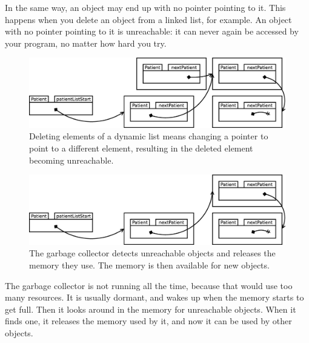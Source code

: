 In the same way, an object may end up with no pointer pointing to
it. This happens when you delete an object from a linked list, for
example. An object with no pointer pointing to it is unreachable: it
can never again be accessed by your program, no matter how hard you
try. 

\begin{figure}[hbtp]
  \centering
  \includegraphics[width=\textwidth]{gfx/lists-remove-2}
  \caption{Deleting elements of a dynamic list means changing a pointer
    to point to a different element, resulting in the deleted element
    becoming unreachable.}
  \label{fig:padfsajdg4g}
\end{figure}

\begin{figure}[hbtp]
  \centering
  \includegraphics[width=\textwidth]{gfx/lists-remove-3}
  \caption{The garbage collector detects unreachable objects and
    releases the memory they use. The memory is then available for new
    objects.}
  \label{fig:padfsajdg4eg}
\end{figure}



The garbage collector is not running all the time, because that would
use too many resources. It is usually dormant, and wakes up when the
memory starts to get full. Then it looks around in the memory for
unreachable objects. When it finds one, it releases the memory used by
it, and now it can be used by other objects. 

